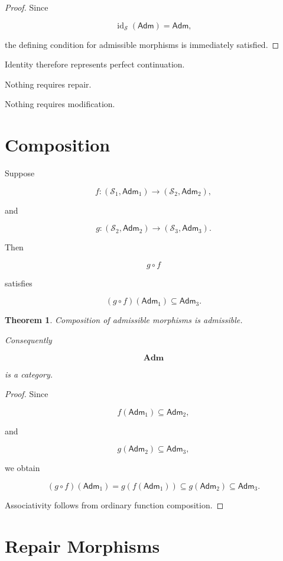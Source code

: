\documentclass[11pt,oneside]{book}
\numberwithin{equation}{chapter}
\theoremstyle{definition}
\theoremstyle{plain}
\newtheorem{theorem}[definition]{Theorem}
\DeclareMathOperator{\id}{id}
\newcommand{\State}{\mathcal{S}}
\newcommand{\Adm}{\mathsf{Adm}}
\begin{document}
\begin{proof}

Since

\[
\id_{\State}(\Adm)=\Adm,
\]

the defining condition for admissible morphisms is immediately satisfied.

\end{proof}

Identity therefore represents perfect continuation.

Nothing requires repair.

Nothing requires modification.

\section{Composition}

Suppose

\[
f:
(\State_1,\Adm_1)
\rightarrow
(\State_2,\Adm_2),
\]

and

\[
g:
(\State_2,\Adm_2)
\rightarrow
(\State_3,\Adm_3).
\]

Then

\[
g\circ f
\]

satisfies

\[
(g\circ f)(\Adm_1)
\subseteq
\Adm_3.
\]

\begin{theorem}

Composition of admissible morphisms is admissible.

Consequently

\[
\mathbf{Adm}
\]

is a category.

\end{theorem}

\begin{proof}

Since

\[
f(\Adm_1)
\subseteq
\Adm_2,
\]

and

\[
g(\Adm_2)
\subseteq
\Adm_3,
\]

we obtain

\[
(g\circ f)(\Adm_1)
=
g(f(\Adm_1))
\subseteq
g(\Adm_2)
\subseteq
\Adm_3.
\]

Associativity follows from ordinary function composition.

\end{proof}

\section{Repair Morphisms}
\end{document}
